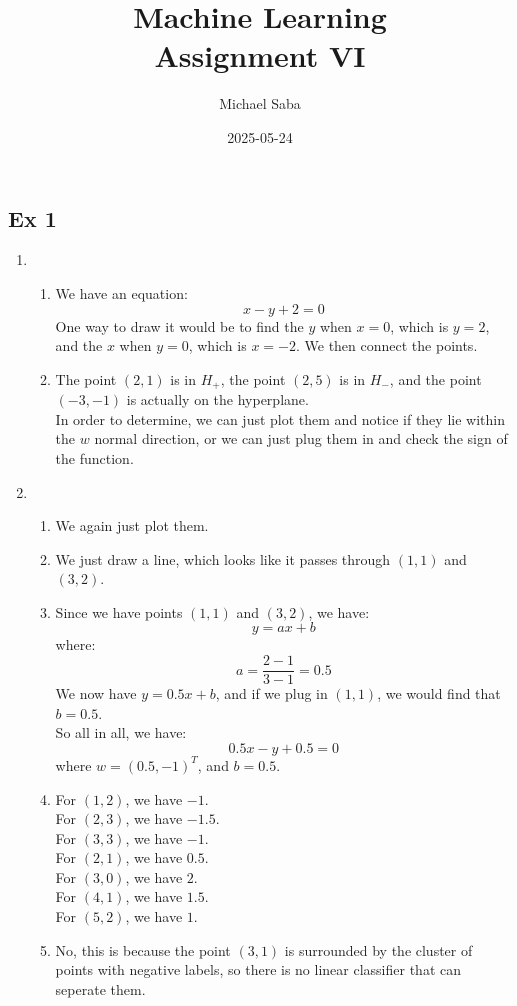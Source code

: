 \documentclass[12pt]{article}
\title{
    \Huge Machine Learning \\
    \Large Assignment VI
}
\date{2025-05-24}
\author{Michael Saba}
\begin{document}
\maketitle
\newpage
\setlength{\parindent}{0pt}

\subsection*{Ex 1}

\begin{enumerate}[label = \letters]
\item 
    \begin{enumerate}
    \item 
        We have an equation:
        \[ x - y +2 = 0 \]
        One way to draw it would be to
        find the $y$ when $x= 0$,
        which is $y = 2$,
        and the $x$ when $y = 0$,
        which is $x = -2$.
        We then connect the points.
    \item
        The point $(2, 1)$ is in $H_+$,
        the point $(2, 5)$ is in $H_-$,
        and the point $(-3, -1)$
        is actually on the hyperplane. \\
        In order to determine, we can just
        plot them and notice if they lie within
        the $w$ normal direction, or we can
        just plug them in and check the sign
        of the function.
    \end{enumerate}
\item 
     \begin{enumerate}
    \item 
        We again just plot them.
    \item
        We just draw a line,
        which looks like it passes through
        $(1, 1)$ and $(3, 2)$.
    \item 
        Since we have points $(1, 1)$ and $(3, 2)$,
        we have:
        \[ y = ax + b \]
        where:
        \[ a = \dfrac{2-1}{3-1} = 0.5 \]
        We now have $y = 0.5x + b$,
        and if we plug in $(1, 1)$,
        we would find that $b = 0.5$. \\
        So all in all, we have:
        \[ 0.5x - y + 0.5 = 0 \]
        where $w = (0.5, -1)^T$, and $b = 0.5$.
    \item 
        For $(1,2)$, we have $-1$. \\
        For $(2,3)$, we have $-1.5$. \\
        For $(3,3)$, we have $-1$. \\
        For $(2,1)$, we have $0.5$. \\
        For $(3,0)$, we have $2$. \\
        For $(4,1)$, we have $1.5$. \\
        For $(5,2)$, we have $1$.
    \item 
        No, this is because the
        point $(3, 1)$ is surrounded by the cluster
        of points with negative labels,
        so there is no linear classifier
        that can seperate them.  
    \end{enumerate}
\end{enumerate}
\end{document}
